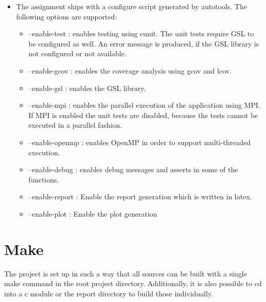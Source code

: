 \documentclass[12pt,a4paper]{report}
\begin{document}
\begin{itemize}
\item The assignment ships with a configure script generated by
  autotools. The following options are supported:
  \begin{itemize}
  \item --enable-test : enables testing using cunit. The unit tests
    require GSL to be configured as well. An error message is
    produced, if the GSL library is not configured or not available.
  \item --enable-gcov : enables the coverage analysis using gcov and
    lcov.
  \item --enable-gsl : enables the GSL library.
  \item --enable-mpi : enables the parallel execution of the
    application using MPI. If MPI is enabled the unit tests are
    disabled, because the tests cannot be executed in a parallel fashion.
  \item --enable-openmp : enables OpenMP in order to support
    multi-threaded execution.
  \item --enable-debug : enables debug messages and asserts in some of
    the functions.
  \item --enable-report : Enable the report generation which is
    written in latex.
  \item --enable-plot : Enable the plot generation
  \end{itemize}
\end{itemize}

\section{Make}
\label{sec:make}

The project is set up in such a way that all sources can be built with
a single make command in the root project directory. Additionally, it
is also possible to cd into a c module or the report directory to
build those individually.
\end{document}
